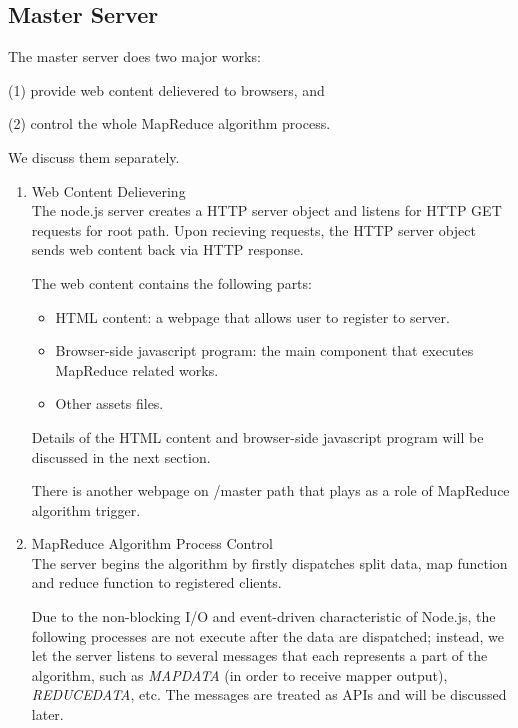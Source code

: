 \subsection{Master Server}

The master server does two major works:

(1) provide web content delievered to browsers, and

(2) control the whole MapReduce algorithm process.

We discuss them separately.

\begin{enumerate}

\item Web Content Delievering\\
The node.js server creates a HTTP server object and listens for HTTP GET requests for root path.
Upon recieving requests, the HTTP server object sends web content back via HTTP response.

The web content contains the following parts:
\begin{itemize}

\item HTML content: a webpage that allows user to register to server.

\item Browser-side javascript program: the main component that executes MapReduce related works.

\item Other assets files.

\end{itemize}
Details of the HTML content and browser-side javascript program will be discussed in the next section.

There is another webpage on /master path that plays as a role of MapReduce algorithm trigger.

\item MapReduce Algorithm Process Control\\
The server begins the algorithm by firstly dispatches split data, map function and reduce function to registered clients.

Due to the non-blocking I/O and event-driven characteristic of Node.js, the following processes are not execute after the data are dispatched; instead, we let the server listens to several messages that each represents a part of the algorithm, such as \emph{MAPDATA} (in order to receive mapper output), \emph{REDUCEDATA}, etc. The messages are treated as APIs and will be discussed later.

\end{enumerate}
